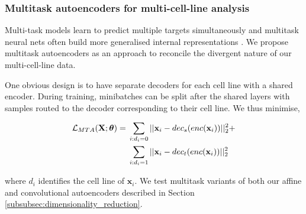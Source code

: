 \subsubsection{Multitask autoencoders for multi-cell-line analysis}
\label{subsubsec:multitask}




Multi-task models learn to predict multiple targets simultaneously and multitask neural nets often build more generalised internal representations \cite{caruana1997multitask}. We propose multitask autoencoders as an approach to reconcile the divergent nature of our multi-cell-line data.

One obvious design is to have separate decoders for each cell line with a shared encoder. During training, minibatches can be split after the shared layers with samples routed to the decoder corresponding to their cell line. We thus minimise,

\begin{align}
\mathcal{L}_{MTA}(\mathbf{X} ; \boldsymbol\theta) ={} & \sum_{i : d_i = 0}||\mathbf{x}_i - dec_s(enc(\mathbf{x}_i))||_2^2 + \\ \notag
 & \sum_{i : d_i = 1}||\mathbf{x}_i - dec_t(enc(\mathbf{x}_i))||_2^2 \notag
\end{align}

where $d_i$ identifies the cell line of $\mathbf{x}_i$. We test multitask variants of both our affine and convolutional autoencoders described in Section \ref{subsubsec:dimensionality_reduction}.
    
